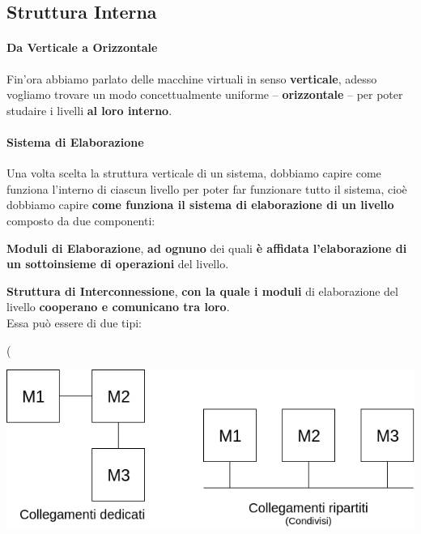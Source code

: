 \documentclass[10pt]{report}
\begin{document}
\subsection{Struttura Interna}
\paragraph{Da Verticale a Orizzontale} Fin'ora abbiamo parlato delle macchine virtuali in senso \textbf{verticale}, adesso vogliamo trovare un modo concettualmente uniforme -- \textbf{orizzontale} -- per poter studaire i livelli \textbf{al loro interno}.
\paragraph{Sistema di Elaborazione} Una volta scelta la struttura verticale di un sistema, dobbiamo capire come funziona l'interno di ciascun livello per poter far funzionare tutto il sistema, cioè dobbiamo capire \textbf{come funziona il sistema di elaborazione di un livello} composto da due componenti:
\begin{list}{}{}
	\item \textbf{Moduli di Elaborazione}, \textbf{ad ognuno} dei quali \textbf{è affidata l'elaborazione di un sottoinsieme di operazioni} del livello.
	\item \textbf{Struttura di Interconnessione}, \textbf{con la quale i moduli} di elaborazione del livello \textbf{cooperano e comunicano tra loro}.\\
	Essa può essere di due tipi:
\end{list}
	(\begin{center}\includegraphics[scale=0.6]{strutturainterna.png}
\end{center}
\end{document}
